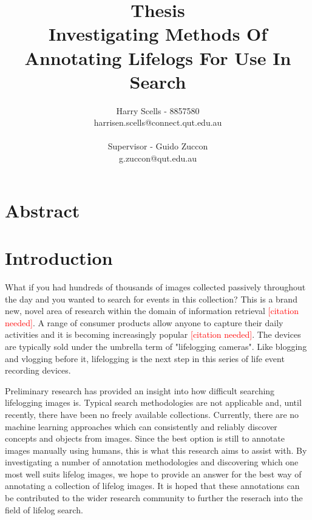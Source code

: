 \documentclass[12pt,a4paper]{article}
\newcommand\todo[1]{\textcolor{red}{#1}}
\begin{document}
\title{\small Thesis\\\huge Investigating Methods Of Annotating Lifelogs For Use In Search}

\author{Harry Scells - 8857580\\harrisen.scells@connect.qut.edu.au\\\\\small Supervisor - Guido Zuccon\\\small g.zuccon@qut.edu.au\\}
\maketitle
\pagebreak
\tableofcontents
\pagebreak

\section{Abstract}

\section{Introduction}

What if you had hundreds of thousands of images collected passively throughout the day and you wanted to search for events in this collection? This is a brand new, novel area of research within the domain of information retrieval \todo{[citation needed]}. A range of consumer products allow anyone to capture their daily activities and it is becoming increasingly popular \todo{[citation needed]}. The devices are typically sold under the umbrella term of "lifelogging cameras". Like blogging and vlogging before it, lifelogging is the next step in this series of life event recording devices.

Preliminary research has provided an insight into how difficult searching lifelogging images is. Typical search methodologies are not applicable and, until recently, there have been no freely available collections. Currently, there are no machine learning approaches which can consistently and reliably discover concepts and objects from images. Since the best option is still to annotate images manually using humans, this is what this research aims to assist with. By investigating a number of annotation methodologies and discovering which one most well suits lifelog images, we hope to provide an answer for the best way of annotating a collection of lifelog images. It is hoped that these annotations can be contributed to the wider research community to further the reserach into the field of lifelog search.
\end{document}

